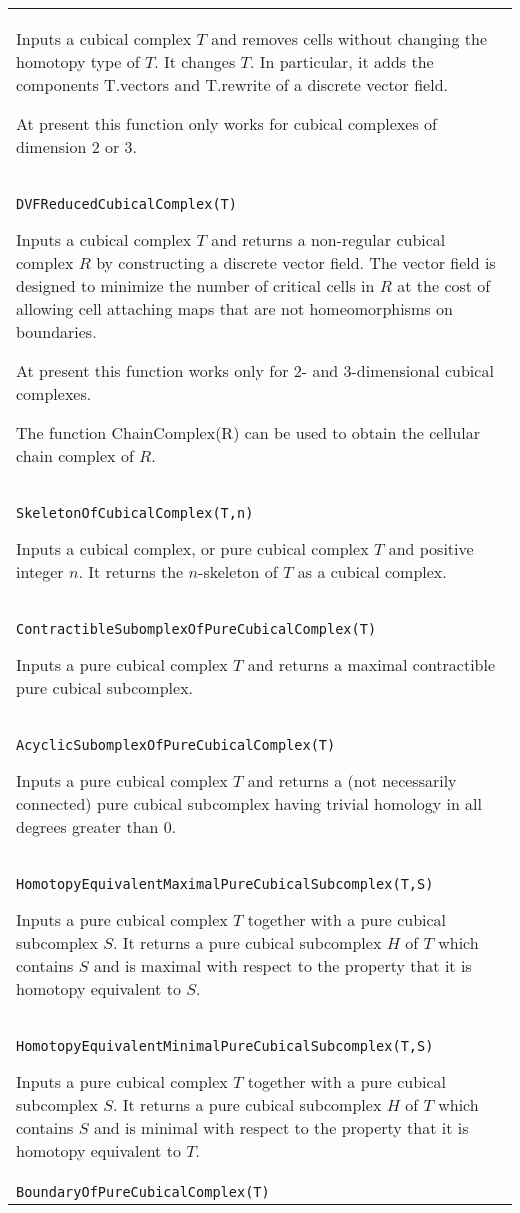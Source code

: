 \documentclass[a4paper,11pt]{report}
\begin{document}
{\begin{center}
\begin{tabular}{|l|}
 Inputs a cubical complex $T$ and removes cells without changing the homotopy type of $T$. It changes $T$. In particular, it adds the components T.vectors and T.rewrite of a discrete
vector field. 

 At present this function only works for cubical complexes of dimension 2 or 3. \\
 \index{DVFReducedCubicalComplex} \texttt{DVFReducedCubicalComplex(T)} 

 Inputs a cubical complex $T$ and returns a non-regular cubical complex $R$ by constructing a discrete vector field. The vector field is designed to
minimize the number of critical cells in $R$ at the cost of allowing cell attaching maps that are not homeomorphisms on
boundaries. 

 At present this function works only for 2- and 3-dimensional cubical
complexes. 

 The function ChainComplex(R) can be used to obtain the cellular chain complex
of $R$. \\
 \index{SkeletonOfCubicalComplex} \texttt{SkeletonOfCubicalComplex(T,n)} 

 Inputs a cubical complex, or pure cubical complex $T$ and positive integer $n$. It returns the $n$-skeleton of $T$ as a cubical complex. \\
 \index{ContractibleSubomplexOfPureCubicalComplex} \texttt{ContractibleSubomplexOfPureCubicalComplex(T)} 

 Inputs a pure cubical complex $T$ and returns a maximal contractible pure cubical subcomplex. \\
 \index{AcyclicSubomplexOfPureCubicalComplex} \texttt{AcyclicSubomplexOfPureCubicalComplex(T)} 

 Inputs a pure cubical complex $T$ and returns a (not necessarily connected) pure cubical subcomplex having
trivial homology in all degrees greater than $0$. \\
 \index{HomotopyEquivalentMaximalPureCubicalSubcomplex} \texttt{HomotopyEquivalentMaximalPureCubicalSubcomplex(T,S)} 

 Inputs a pure cubical complex $T$ together with a pure cubical subcomplex $S$. It returns a pure cubical subcomplex $H$ of $T$ which contains $S$ and is maximal with respect to the property that it is homotopy equivalent to $S$. \\
 \index{HomotopyEquivalentMinimalPureCubicalSubcomplex} \texttt{HomotopyEquivalentMinimalPureCubicalSubcomplex(T,S)} 

 Inputs a pure cubical complex $T$ together with a pure cubical subcomplex $S$. It returns a pure cubical subcomplex $H$ of $T$ which contains $S$ and is minimal with respect to the property that it is homotopy equivalent to $T$. \\
 \index{BoundaryOfPureCubicalComplex} \texttt{BoundaryOfPureCubicalComplex(T)} 


\end{tabular}
\end{center}}
\end{document}
